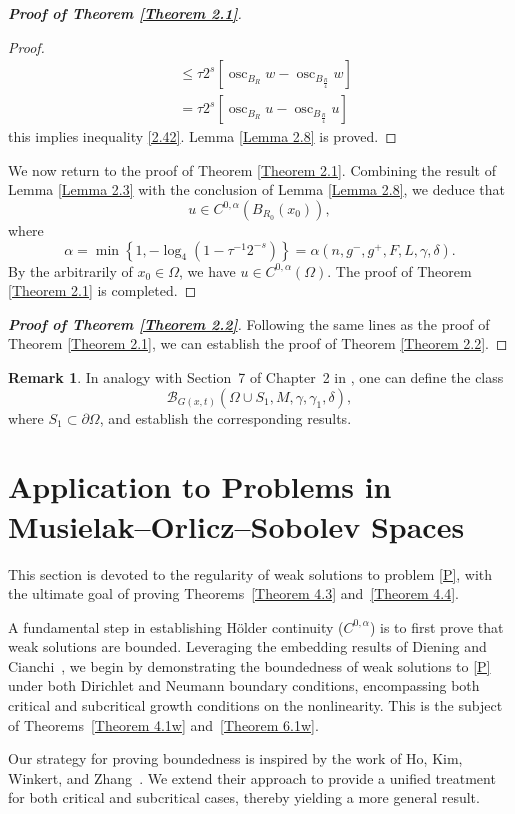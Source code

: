 \documentclass[10pt,reqno]{amsart}
\newcommand *\w{^\wedge}
\theoremstyle{definition}
\newtheorem{remark}[theorem]{Remark}
\numberwithin{equation}{section}
\begin{document}
\begin{proof}[\textbf{Proof of Theorem \ref{Theorem 2.1}}]
\begin{proof}
\begin{align*}
&\leq \tau 2^s [\operatorname{osc}_{B_R}w - \operatorname{osc}_{B_{\frac{R}{4}}}w]\\
&= \tau 2^s \left[\operatorname{osc}_{B_R}u - \operatorname{osc}_{B_{\frac{R}{4}}}u\right]
\end{align*}
this implies inequality \eqref{2.42}. Lemma \ref{Lemma 2.8} is proved.
\end{proof}
We now return to the proof of Theorem \ref{Theorem 2.1}. Combining the result of Lemma \ref{Lemma 2.3} with the conclusion of Lemma \ref{Lemma 2.8}, we deduce that 
\[
u \in C^{0,\alpha}(B_{R_0}(x_0)),
\] where
\[
\alpha = \min\left\{1, -\log_4(1 - \tau^{-1} 2^{-s})\right\} = \alpha(n, g^-, g^+, F, L,\gamma, \delta).
\]
By the arbitrarily of \(x_0 \in \Omega\), we have \(u \in C^{0,\alpha}(\Omega)\). The proof of Theorem \ref{Theorem 2.1} is completed.
\end{proof}
\begin{proof}[\textbf{Proof of Theorem \ref{Theorem 2.2}}]
    Following the same lines as the proof of Theorem \ref{Theorem 2.1}, we can establish the proof of Theorem \ref{Theorem 2.2}.
\end{proof}
\begin{remark}\label{Remark 2.3}
In analogy with Section~7 of Chapter~2 in \cite{OL}, one can define the class 
\[
\mathcal{B}_{G(x,t)}(\Omega \cup S_1, M, \gamma, \gamma_1, \delta),
\]
where \( S_1 \subset \partial \Omega \), and establish the corresponding results.
\end{remark}
\section{Application to Problems in Musielak--Orlicz--Sobolev Spaces}

This section is devoted to the regularity of weak solutions to problem \eqref{P}, with the ultimate goal of proving Theorems~\ref{Theorem 4.3} and~\ref{Theorem 4.4}.

A fundamental step in establishing Hölder continuity ($C^{0,\alpha}$) is to first prove that weak solutions are bounded. Leveraging the embedding results of Diening and Cianchi~\cite{Cianchi2024}, we begin by demonstrating the boundedness of weak solutions to \eqref{P} under both Dirichlet and Neumann boundary conditions, encompassing both critical and subcritical growth conditions on the nonlinearity. This is the subject of Theorems~\ref{Theorem 4.1w} and~\ref{Theorem 6.1w}.

Our strategy for proving boundedness is inspired by the work of Ho, Kim, Winkert, and Zhang~\cite{KKPZ}. We extend their approach to provide a unified treatment for both critical and subcritical cases, thereby yielding a more general result.
\end{document}
